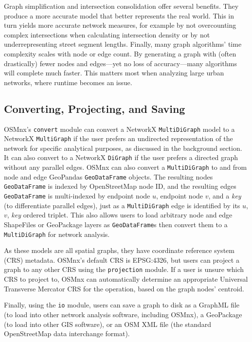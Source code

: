 \documentclass[12pt,letterpaper]{article} %
\begin{document}
Graph simplification and intersection consolidation offer several benefits. They produce a more accurate model that better represents the real world. This in turn yields more accurate network measures, for example by not overcounting complex intersections when calculating intersection density or by not underrepresenting street segment lengths. Finally, many graph algorithms' time complexity scales with node or edge count. By generating a graph with (often drastically) fewer nodes and edges---yet no loss of accuracy---many algorithms will complete much faster. This matters most when analyzing large urban networks, where runtime becomes an issue.

\subsection{Converting, Projecting, and Saving}

OSMnx's \texttt{convert} module can convert a NetworkX \texttt{MultiDiGraph} model to a NetworkX \texttt{MultiGraph} if the user prefers an undirected representation of the network for specific analytical purposes, as discussed in the background section. It can also convert to a NetworkX \texttt{DiGraph} if the user prefers a directed graph without any parallel edges. OSMnx can also convert a \texttt{MultiDiGraph} to and from node and edge GeoPandas \texttt{GeoDataFrame} objects. The resulting nodes \texttt{GeoDataFrame} is indexed by OpenStreetMap node ID, and the resulting edges \texttt{GeoDataFrame} is multi-indexed by endpoint node $u$, endpoint node $v$, and a \textit{key} (to differentiate parallel edges), just as a \texttt{MultiDiGraph} edge is identified by its $u$, $v$, \textit{key} ordered triplet. This also allows users to load arbitrary node and edge ShapeFiles or GeoPackage layers as \texttt{GeoDataFrame}s then convert them to a \texttt{MultiDiGraph} for network analysis.

As these models are all spatial graphs, they have coordinate reference system (CRS) metadata. OSMnx's default CRS is EPSG:4326, but users can project a graph to any other CRS using the \texttt{projection} module. If a user is unsure which CRS to project to, OSMnx can automatically determine an appropriate Universal Transverse Mercator CRS for the operation, based on the graph nodes' centroid.

Finally, using the \texttt{io} module, users can save a graph to disk as a GraphML file (to load into other network analysis software, including OSMnx), a GeoPackage (to load into other GIS software), or an OSM XML file (the standard OpenStreetMap data interchange format).
\end{document}
